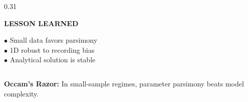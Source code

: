 \documentclass[aspectratio=169, 10pt]{beamer}
\begin{document}
\begin{frame}
\begin{tcolorbox}[contentframe]
\begin{columns}[T]
    \begin{column}{0.31\textwidth}
      \begin{tcolorbox}[glowcard, height=3.85cm, valign=top]
        \centering
        {\fontsize{9.5pt}{11pt}\selectfont\color{cyanGlow}\textbf{LESSON LEARNED}}\\[4pt]
        \raggedright{\fontsize{8.5pt}{10pt}\selectfont
        $\bullet$ Small data favors parsimony\\[3pt]
        $\bullet$ 1D robust to recording bias\\[3pt]
        $\bullet$ Analytical solution is stable}
      \end{tcolorbox}
    \end{column}
  \end{columns}
  
  \vspace{10pt}
  \begin{center}
    {\fontsize{8.5pt}{10pt}\selectfont\color{textMuted}\textbf{Occam's Razor:} In small-sample regimes, parameter parsimony beats model complexity.}
  \end{center}
  \end{tcolorbox}
\end{frame}

\end{document}
